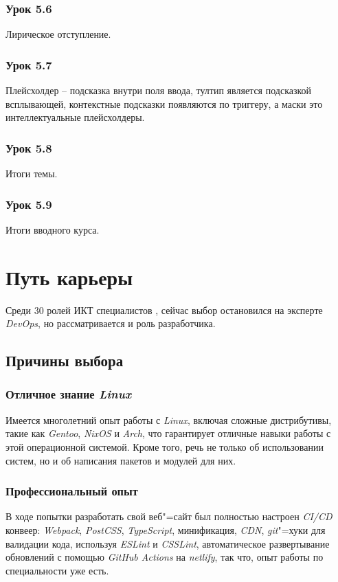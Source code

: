 \documentclass[variant=practice]{bsuir}
\begin{document}
\subsection{Урок 5.6} Лирическое отступление.

\subsection{Урок 5.7} Плейсхолдер -- подсказка внутри поля ввода, тултип
является подсказкой всплывающей, контекстные подсказки появляются по триггеру, а
маски это интеллектуальные плейсхолдеры.

\subsection{Урок 5.8} Итоги темы.

\subsection{Урок 5.9} Итоги вводного курса.

\chapter{Путь карьеры}

Среди 30 ролей ИКТ специалистов \cite{majors}, сейчас выбор остановился на
эксперте \textit{DevOps}, но рассматривается и роль разработчика.

\section{Причины выбора}

\subsection{Отличное знание \textit{Linux}} Имеется многолетний опыт работы с
\textit{Linux}, включая сложные дистрибутивы, такие как \textit{Gentoo},
\textit{NixOS} и \textit{Arch}, что гарантирует отличные навыки работы с этой
операционной системой. Кроме того, речь не только об использовании систем, но и
об написания пакетов и модулей для них.

\subsection{Профессиональный опыт} В ходе попытки разработать свой веб"=сайт был
полностью настроен \textit{CI/CD} конвеер: \textit{Webpack}, \textit{PostCSS},
\textit{TypeScript}, минификация, \textit{CDN}, \textit{git}"=хуки для валидации
кода, используя \textit{ESLint} и \textit{CSSLint}, автоматическое развертывание
обновлений с помощью \textit{GitHub Actions} на \textit{netlify}, так что, опыт
работы по специальности уже есть.
\end{document}
